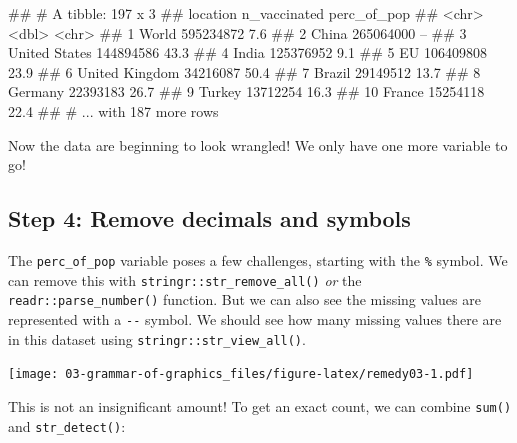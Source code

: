 \documentclass[11pt,]{article}
\newenvironment{Shaded}{\begin{snugshade}}{\end{snugshade}}
\newcommand{\AttributeTok}[1]{\textcolor[rgb]{0.77,0.63,0.00}{#1}}
\newcommand{\ConstantTok}[1]{\textcolor[rgb]{0.00,0.00,0.00}{#1}}
\newcommand{\FunctionTok}[1]{\textcolor[rgb]{0.00,0.00,0.00}{#1}}
\newcommand{\NormalTok}[1]{#1}
\newcommand{\SpecialCharTok}[1]{\textcolor[rgb]{0.00,0.00,0.00}{#1}}
\newcommand{\StringTok}[1]{\textcolor[rgb]{0.31,0.60,0.02}{#1}}
\let\oldShaded\Shaded
\let\endoldShaded\endShaded
\renewenvironment{Shaded}{\footnotesize\oldShaded}{\endoldShaded}
\let\oldverbatim\verbatim
\let\endoldverbatim\endverbatim
\renewenvironment{verbatim}{\footnotesize\oldverbatim}{\endoldverbatim}
\begin{document}
\begin{verbatim}
## # A tibble: 197 x 3
##    location       n_vaccinated perc_of_pop
##    <chr>                 <dbl> <chr>      
##  1 World             595234872 7.6%       
##  2 China             265064000 --         
##  3 United States     144894586 43.3%      
##  4 India             125376952 9.1%       
##  5 EU                106409808 23.9%      
##  6 United Kingdom     34216087 50.4%      
##  7 Brazil             29149512 13.7%      
##  8 Germany            22393183 26.7%      
##  9 Turkey             13712254 16.3%      
## 10 France             15254118 22.4%      
## # ... with 187 more rows
\end{verbatim}

Now the data are beginning to look wrangled! We only have one more
variable to go!

\hypertarget{step-4-remove-decimals-and-symbols}{%
\subsection{Step 4: Remove decimals and
symbols}\label{step-4-remove-decimals-and-symbols}}

The \texttt{perc\_of\_pop} variable poses a few challenges, starting
with the \texttt{\%} symbol. We can remove this with
\texttt{stringr::str\_remove\_all()} \emph{or} the
\texttt{readr::parse\_number()} function. But we can also see the
missing values are represented with a \texttt{-\/-} symbol. We should
see how many missing values there are in this dataset using
\texttt{stringr::str\_view\_all()}.

\begin{Shaded}
\end{Shaded}

\texttt{[image: 03-grammar-of-graphics\_files/figure-latex/remedy03-1.pdf]}

This is not an insignificant amount! To get an exact count, we can
combine \texttt{sum()} and \texttt{str\_detect()}:

\begin{Shaded}
\end{Shaded}
\end{document}

